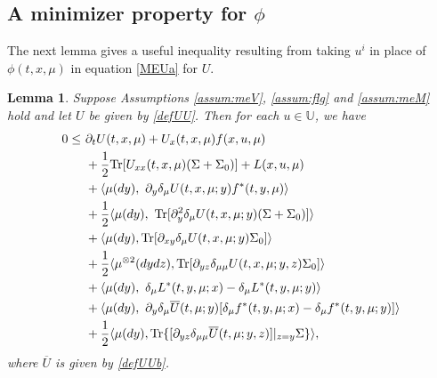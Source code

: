 \documentclass{amsart}
\newtheorem{lemma}[theorem]{Lemma}
\theoremstyle{definition}
\theoremstyle{remark}
\numberwithin{equation}{section}
\begin{document}
\subsection{A minimizer property for $\phi$}


The next lemma gives a useful inequality resulting from taking $u^i$ in place of $\phi(t, x, \mu)$ in equation \eqref{MEUa} for $U$.



\begin{lemma}\label{lemma:optimizer}
Suppose Assumptions \ref{assum:meV}, \ref{assum:flg} and \ref{assum:meM} hold and    let $U$ be given by \eqref{defUU}.
Then for each $u\in \mathbb{U }$, we have
\begin{align}
0\le \ &\partial_t U(t, x,\mu) + U_x(t,x,\mu) f(x,u,\mu)  \label{MEU}   \\
&+ \frac{1}{2}{\rm Tr}[  U_{xx}(t, x, \mu)
(\Sigma+\Sigma_0)]+L( x, u,\mu)\notag \\
 & + \langle \mu(dy), \ \partial_y\delta_\mu U(t,x,\mu;y) f^*(t,y,\mu)\rangle \nonumber \\
& +\frac12 \langle \mu(dy), \   {\rm Tr}[ \partial_{y}^2 \delta_\mu U(t,x,\mu; y)( \Sigma  +\Sigma_0)]\rangle \nonumber \\
& + \langle \mu(dy),   {\rm Tr}[ \partial_{xy} \delta_\mu U(t, x, \mu; y) \Sigma_0] \rangle   \notag  \\
& +\frac12 \langle \mu^{\otimes 2} (dydz), {\rm Tr}[ \partial_{yz}  \delta_{\mu\mu} U(t, x, \mu; y,z) \Sigma_0 ]     \rangle    \notag   \\
 & + \langle \mu(dy) , \   \delta_\mu L^* (t,y,\mu; x) - \delta_\mu L^*(t,y,\mu; y) \rangle \nonumber  \\
 & + \langle \mu(dy) , \  \partial_y \delta_\mu \overline U(t,\mu;y)    [\delta_\mu f^* (t,y,\mu; x) - \delta_\mu f^*(t,y,\mu; y)] \rangle \nonumber \\
  &+   \frac{1}{2}\langle \mu(dy),    {\rm Tr}\{ [\partial_{yz}
\delta_{\mu\mu}
\overline U(t,\mu;y, z)]|_{z=y}\Sigma\}\rangle,\notag
\end{align}
where $\overline U$ is given by \eqref{defUUb}.
\end{lemma}
\end{document}
